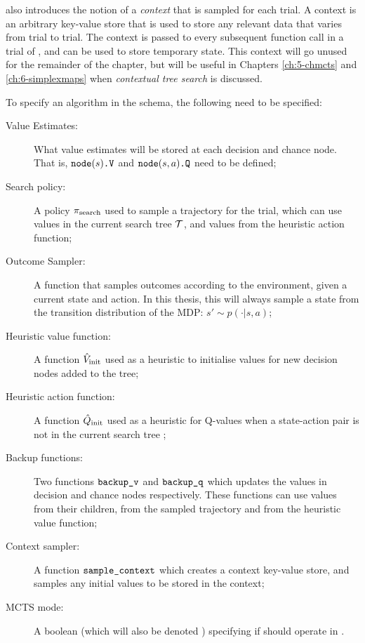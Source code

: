         \thtspp\ewe also introduces the notion of a \textit{context} that is sampled for each trial. A context is an arbitrary key-value store that is used to store any relevant data that varies from trial to trial. The context is passed to every subsequent function call in a trial of \thtspp, and can be used to store temporary state. This context will go unused for the remainder of the chapter, but will be useful in Chapters \ref{ch:5-chmcts} and \ref{ch:6-simplexmaps} when \textit{contextual tree search} is discussed. 

        To specify an algorithm in the \thtspp\ewe schema, the following need to be specified:
        \begin{description}
            \item[Value Estimates:]
                What value estimates will be stored at each decision and chance node. That is, ${{\textnormal{\texttt{node}}}(s)\textnormal{\texttt{.V}}}$ and ${{\textnormal{\texttt{node}}}(s,a)\textnormal{\texttt{.Q}}}$ need to be defined;
            \item[Search policy:]
                A policy ${\pi_{\textnormal{search}}}$ used to sample a trajectory for the trial, which can use values in the current search tree $\mathcal{T}$, and values from the heuristic action function;
            \item[Outcome Sampler:]
                A function \sampleoutcome\ewe that samples outcomes according to the environment, given a current state and action. In this thesis, this will always sample a state from the transition distribution of the MDP: $s'\sim p(\cdot|s,a)$;
            \item[Heuristic value function:]
                A function ${\hat{V}_{\textnormal{init}}}$ used as a heuristic to initialise values for new decision nodes added to the tree;
            \item[Heuristic action function:]
                A function ${\hat{Q}_{\textnormal{init}}}$ used as a heuristic for Q-values when a state-action pair is not in the current search tree ;
            \item[Backup functions:]
                Two functions ${\textnormal{\texttt{backup\_v}}}$ and ${\textnormal{\texttt{backup\_q}}}$ which updates the values in decision and chance nodes respectively. These functions can use values from their children, from the sampled trajectory and from the heuristic value function;
            \item[Context sampler:]
                A function ${\textnormal{\texttt{sample\_context}}}$ which creates a context key-value store, and samples any initial values to be stored in the context;
            \item[MCTS mode:]
                A boolean (which will also be denoted \mctsmode) specifying if \thtspp\ewe should operate in \mctsmode. 
        \end{description}

